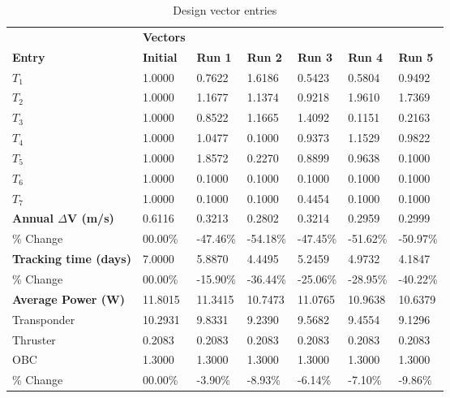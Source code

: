 \begin{table}[H]
\centering
\begin{tabular}{lllllll}
\textbf{} & \cellcolor[HTML]{EFEFEF}\textbf{Vectors} & \textbf{} & \textbf{} & \textbf{} & \textbf{} & \textbf{} \\
\rowcolor[HTML]{EFEFEF} \cellcolor[HTML]{EFEFEF}\textbf{Entry} & \cellcolor[HTML]{EFEFEF}\textbf{Initial} & \cellcolor[HTML]{EFEFEF}\textbf{Run 1} & \cellcolor[HTML]{EFEFEF}\textbf{Run 2} & \cellcolor[HTML]{EFEFEF}\textbf{Run 3} & \cellcolor[HTML]{EFEFEF}\textbf{Run 4} & \cellcolor[HTML]{EFEFEF}\textbf{Run 5} \\
$T_{1}$ & 1.0000 & 0.7622 & 1.6186 & 0.5423 & 0.5804 & 0.9492 \\
$T_{2}$ & 1.0000 & 1.1677 & 1.1374 & 0.9218 & 1.9610 & 1.7369 \\
$T_{3}$ & 1.0000 & 0.8522 & 1.1665 & 1.4092 & 0.1151 & 0.2163 \\
$T_{4}$ & 1.0000 & 1.0477 & 0.1000 & 0.9373 & 1.1529 & 0.9822 \\
$T_{5}$ & 1.0000 & 1.8572 & 0.2270 & 0.8899 & 0.9638 & 0.1000 \\
$T_{6}$ & 1.0000 & 0.1000 & 0.1000 & 0.1000 & 0.1000 & 0.1000 \\
$T_{7}$ & 1.0000 & 0.1000 & 0.1000 & 0.4454 & 0.1000 & 0.1000 \\
\rowcolor[HTML]{EFEFEF} 
\cellcolor[HTML]{EFEFEF}\textbf{Annual $\Delta \boldsymbol{V}$ (m/s)} & \cellcolor[HTML]{EFEFEF}0.6116 & 0.3213 & 0.2802 & 0.3214 & 0.2959 & 0.2999 \\
\% Change & 00.00\% &-47.46\% & -54.18\% & -47.45\% & -51.62\% & -50.97\% \\
\rowcolor[HTML]{EFEFEF} 
\cellcolor[HTML]{EFEFEF}\textbf{Tracking time (days)} & \cellcolor[HTML]{EFEFEF}7.0000 & 5.8870 & 4.4495 & 5.2459 & 4.9732 & 4.1847 \\
\% Change & 00.00\% &-15.90\% & -36.44\% & -25.06\% & -28.95\% & -40.22\% \\
\rowcolor[HTML]{EFEFEF} 
\cellcolor[HTML]{EFEFEF}\textbf{Average Power (W)} & \cellcolor[HTML]{EFEFEF}11.8015 & 11.3415 & 10.7473 & 11.0765 & 10.9638 & 10.6379 \\
Transponder & 10.2931 & 9.8331 & 9.2390 & 9.5682 & 9.4554 & 9.1296 \\
Thruster & 0.2083 & 0.2083 & 0.2083 & 0.2083 & 0.2083 & 0.2083 \\
OBC & 1.3000 & 1.3000 & 1.3000 & 1.3000 & 1.3000 & 1.3000 \\
\% Change & 00.00\% &-3.90\% & -8.93\% & -6.14\% & -7.10\% & -9.86\% \\
\end{tabular}
\caption{Design vector entries}
\label{tab:DesignVectorEntries_default28dur1len3int}
\end{table}